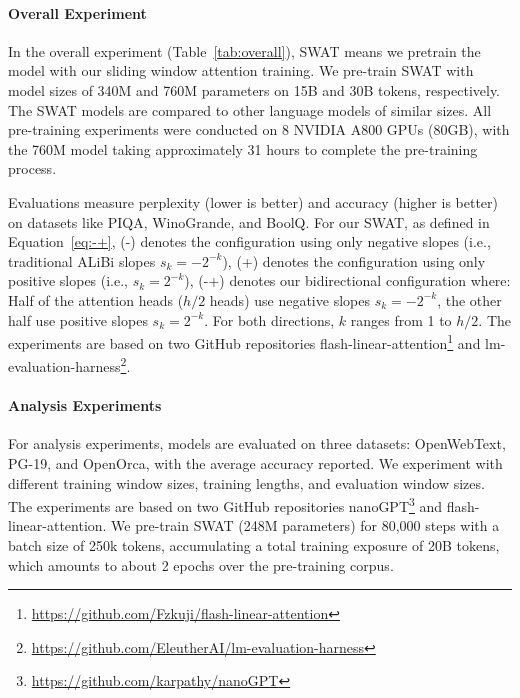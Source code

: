 \paragraph{Overall Experiment}

In the overall experiment (Table~\ref{tab:overall}), SWAT means we pretrain the model with our sliding window attention training. 
We pre-train SWAT with model sizes of 340M and 760M parameters on 15B and 30B tokens, respectively. The SWAT models are compared to other language models of similar sizes. All pre-training experiments were conducted on 8 NVIDIA A800 GPUs (80GB), with the 760M model taking approximately 31 hours to complete the pre-training process.


Evaluations measure perplexity (lower is better) and accuracy (higher is better) on datasets like PIQA, WinoGrande, and BoolQ. 
For our SWAT, as defined in Equation~\eqref{eq:-+}, 
(-) denotes the configuration using only negative slopes (i.e., traditional ALiBi slopes $s_k = -2^{-k}$),
(+) denotes the configuration using only positive slopes (i.e., $s_k = 2^{-k}$),
(-+) denotes our bidirectional configuration where:
Half of the attention heads ($h/2$ heads) use negative slopes $s_k = -2^{-k}$, the other half use positive slopes $s_k = 2^{-k}$.
For both directions, $k$ ranges from 1 to $h/2$.
The experiments are based on two GitHub repositories flash-linear-attention\footnote{\href{https://github.com/Fzkuji/flash-linear-attention}{https://github.com/Fzkuji/flash-linear-attention}} and lm-evaluation-harness\footnote{\href{https://github.com/EleutherAI/lm-evaluation-harness}{https://github.com/EleutherAI/lm-evaluation-harness}}.

\paragraph{Analysis Experiments}

For analysis experiments, models are evaluated on three datasets: OpenWebText, PG-19, and OpenOrca, with the average accuracy reported. We experiment with different training window sizes, training lengths, and evaluation window sizes.  The experiments are based on two GitHub repositories nanoGPT\footnote{\href{https://github.com/karpathy/nanoGPT}{https://github.com/karpathy/nanoGPT}} and flash-linear-attention. We pre-train SWAT (248M parameters) for 80,000 steps with a batch size of 250k tokens, accumulating a total training exposure of 20B tokens, which amounts to  about 2 epochs over the pre-training corpus.

